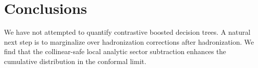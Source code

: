 \section{Conclusions}\label{sec:conclusions}

We have not attempted to quantify contrastive boosted decision trees. A
natural next step is to marginalize over hadronization corrections after
hadronization. We find that the collinear-safe local analytic sector
subtraction enhances the cumulative distribution in the conformal limit.

